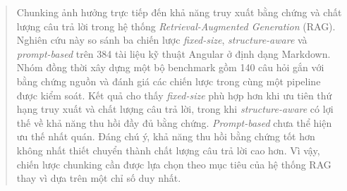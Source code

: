 \begin{abstract}
Chunking ảnh hưởng trực tiếp đến khả năng truy xuất bằng chứng và chất lượng câu trả lời trong hệ thống \textit{Retrieval-Augmented Generation} (RAG). Nghiên cứu này so sánh ba chiến lược \textit{fixed-size}, \textit{structure-aware} và \textit{prompt-based} trên 384 tài liệu kỹ thuật Angular ở định dạng Markdown. Nhóm đồng thời xây dựng một bộ benchmark gồm 140 câu hỏi gắn với bằng chứng nguồn và đánh giá các chiến lược trong cùng một pipeline được kiểm soát. Kết quả cho thấy \textit{fixed-size} phù hợp hơn khi ưu tiên thứ hạng truy xuất và chất lượng câu trả lời, trong khi \textit{structure-aware} có lợi thế về khả năng thu hồi đầy đủ bằng chứng. \textit{Prompt-based} chưa thể hiện ưu thế nhất quán. Đáng chú ý, khả năng thu hồi bằng chứng tốt hơn không nhất thiết chuyển thành chất lượng câu trả lời cao hơn. Vì vậy, chiến lược chunking cần được lựa chọn theo mục tiêu của hệ thống RAG thay vì dựa trên một chỉ số duy nhất.
\end{abstract}